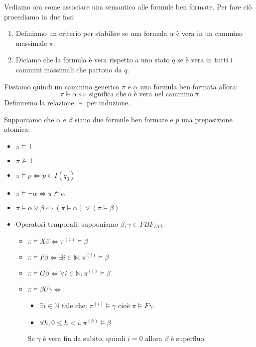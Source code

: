 Vediamo ora come associare una semantica alle formule ben formate. Per fare ciò
procediamo in due fasi:
\begin{enumerate}
    \item Definiamo un criterio per stabilire se una formula $\alpha$ è vera in
          un cammino massimale $\pi$.
    \item Diciamo che la formula è vera rispetto a uno stato $q$ se è vera in
          tutti i cammini massimali che partono da $q$.
\end{enumerate}
Fissiamo quindi un cammino generico $\pi$ e $\alpha$ una formula ben formata allora:
\begin{equation}
    \pi \vDash \alpha \iff \ \text{significa che} \ \alpha \ \text{è vera nel cammino}
    \ \pi
\end{equation}
Definiremo la relazione $\vDash$ per induzione.
\begin{definizione}
    Supponiamo che $\alpha$ e $\beta$ siano due formule ben formate e $p$ una
    preposizione atomica:
    \begin{itemize}
        \item $\pi \vDash \top$
        \item $\pi \not\vDash \bot$
        \item $\pi \vDash p \iff p\in I(q_0)$
        \item $\pi \vDash \lnot \alpha \iff \pi \not\vDash \alpha$
        \item $\pi \vDash \alpha \lor \beta \iff (\pi \vDash \alpha) \lor (\pi
                  \vDash \beta) $
        \item Operatori temporali: supponiamo $\beta, \gamma \in FBF_{LTL}$
              \begin{itemize}
                  \item $\pi \vDash X\beta \iff \pi^{(1)}\vDash \beta$
                  \item $\pi \vDash F \beta \iff \exists i \in \mathbb{N}:
                            \pi^{(i)} \vDash \beta$
                  \item $\pi \vDash G \beta \iff \forall i \in \mathbb{N}:
                            \pi^{(i)} \vDash \beta$
                  \item $\pi \vDash \beta U \gamma \iff$:
                        \begin{itemize}
                            \item $\exists i \in \mathbb{N}$ tale che: $\pi^{(i)}
                                      \vDash \gamma$ cioè $\pi \vDash F \gamma$.
                            \item $\forall h, 0 \leq h < i, \pi^{(h)} \vDash \beta$
                        \end{itemize}
                        Se $\gamma$ è vera fin da subito, quindi $i = 0$ allora
                        $\beta$ è superfluo.
              \end{itemize}
    \end{itemize}
\end{definizione}
